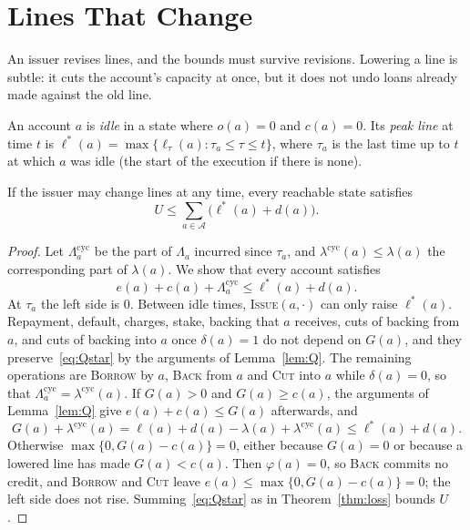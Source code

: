 \documentclass[acmsmall,nonacm,screen]{acmart}
\theoremstyle{acmdefinition}%
\newcommand{\A}{\mathcal{A}}
\newcommand{\Op}[1]{\textsc{#1}}
\begin{document}
\section{Lines That Change}\label{sec:changing}

An issuer revises lines, and the bounds must survive revisions. Lowering a line is subtle: it cuts
the account's capacity at once, but it does not undo loans already made against the old line.

\begin{definition}
An account $a$ is \emph{idle} in a state where $o(a)=0$ and $c(a)=0$. Its \emph{peak line} at time
$t$ is $\ell^*(a)=\max\{\ell_\tau(a):\tau_a\le\tau\le t\}$, where $\tau_a$ is the last time up to
$t$ at which $a$ was idle (the start of the execution if there is none).
\end{definition}

\begin{theorem}\label{thm:changing}
If the issuer may change lines at any time, every reachable state satisfies
\[
  U\le\sum_{a\in\A}\bigl(\ell^*(a)+d(a)\bigr).
\]
\end{theorem}

\begin{proof}
Let $\Lambda^{\mathrm{cyc}}_a$ be the part of $\Lambda_a$ incurred since $\tau_a$, and
$\lambda^{\mathrm{cyc}}(a)\le\lambda(a)$ the corresponding part of $\lambda(a)$. We show that every
account satisfies
\begin{equation}\label{eq:Qstar}
  e(a)+c(a)+\Lambda^{\mathrm{cyc}}_a\le\ell^*(a)+d(a).\tag{Q$^*$}
\end{equation}
At $\tau_a$ the left side is $0$. Between idle times, \Op{Issue}$(a,\cdot)$ can only raise
$\ell^*(a)$. Repayment, default, charges, stake, backing that $a$ receives, cuts of backing from
$a$, and cuts of backing into $a$ once $\delta(a)=1$ do not depend on $G(a)$, and they
preserve~\eqref{eq:Qstar} by the arguments of Lemma~\ref{lem:Q}. The remaining operations are
\Op{Borrow} by $a$, \Op{Back} from $a$ and \Op{Cut} into $a$ while $\delta(a)=0$, so that
$\Lambda^{\mathrm{cyc}}_a=\lambda^{\mathrm{cyc}}(a)$. If $G(a)>0$ and $G(a)\ge c(a)$, the arguments
of Lemma~\ref{lem:Q} give $e(a)+c(a)\le G(a)$ afterwards, and
\[
  G(a)+\lambda^{\mathrm{cyc}}(a)=\ell(a)+d(a)-\lambda(a)+\lambda^{\mathrm{cyc}}(a)\le\ell^*(a)+d(a).
\]
Otherwise $\max\{0,G(a)-c(a)\}=0$, either because $G(a)=0$ or because a lowered line has made
$G(a)<c(a)$. Then $\varphi(a)=0$, so \Op{Back} commits no credit, and \Op{Borrow} and \Op{Cut}
leave $e(a)\le\max\{0,G(a)-c(a)\}=0$; the left side does not rise. Summing~\eqref{eq:Qstar}
as in Theorem~\ref{thm:loss} bounds $U$.
\end{proof}
\end{document}
